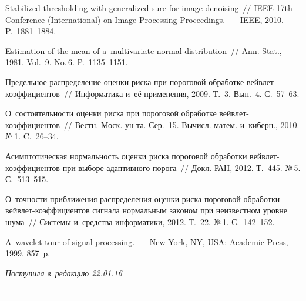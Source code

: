 \begin{multicols}{2}
{{\begin{thebibliography}{99}
 Stabilized thresholding with
generalized sure for image denoising~// IEEE
17th  Conference (International) on Image Processing Proceedings.~---
IEEE, 2010. P.~1881--1884.

 Estimation of the mean of a~multivariate normal distribution~// 
Ann. Stat., 1981. Vol.~9. No.\,6. P.~1135--1151.

 Предельное распределение оценки риска при пороговой обработке 
вейв\-лет-ко\-эф\-фи\-ци\-ен\-тов~// Информатика и~её применения, 2009. Т.~3. 
Вып.~4. С.~57--63.

О~состоятельности оценки риска при пороговой обработке вейв\-лет-ко\-эф\-фи\-ци\-ен\-тов~// 
Вестн. Моск. ун-та. Сер.~15. Вычисл. матем. и~киберн., 2010. №\,1. C.~26--34.

  Асимптотическая нормальность оценки риска пороговой обработки 
вейв\-лет-ко\-эф\-фи\-ци\-ен\-тов при выборе адаптивного порога~// 
Докл. РАН, 2012. Т.~445. №\,5. С.~513--515.

 О~точности приближения распределения оценки риска 
пороговой обработки вейв\-лет-ко\-эф\-фи\-ци\-ен\-тов 
сигнала нормальным законом при неизвестном уровне шума~// Системы и~средства 
информатики, 2012. Т.~22. №\,1. С.~142--152.

 A~wavelet tour of signal processing.~--- New York, NY, USA: 
Academic Press, 1999. 857~p.

\end{thebibliography}

 }
 }

\end{multicols}

\vspace*{-3pt}

\hfill{\small\textit{Поступила в~редакцию 22.01.16}}

\vspace*{8pt}



\hrule

\vspace*{2pt}

\hrule




